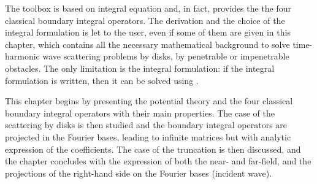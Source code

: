 The \mudiff toolbox is based on integral equation and, in fact, provides the the four classical boundary integral operators. The derivation and the choice of the integral formulation is let to the user, even if some of them are given in this chapter, which contains all the necessary mathematical background to solve  time-harmonic wave scattering problems by disks, by penetrable or impenetrable obstacles. The only limitation is the integral formulation: if the integral formulation is written, then it can be solved using \mudiff.

This chapter begins by presenting the potential theory and the four classical boundary integral operators with their main properties. The case of the scattering by disks is then studied and the boundary integral operators are projected in the Fourier bases, leading to infinite matrices but with analytic expression of the coefficients. The case of the truncation is then discussed, and the chapter concludes with the expression of both the near- and far-field, and the projections of the right-hand side on the Fourier bases (incident wave).